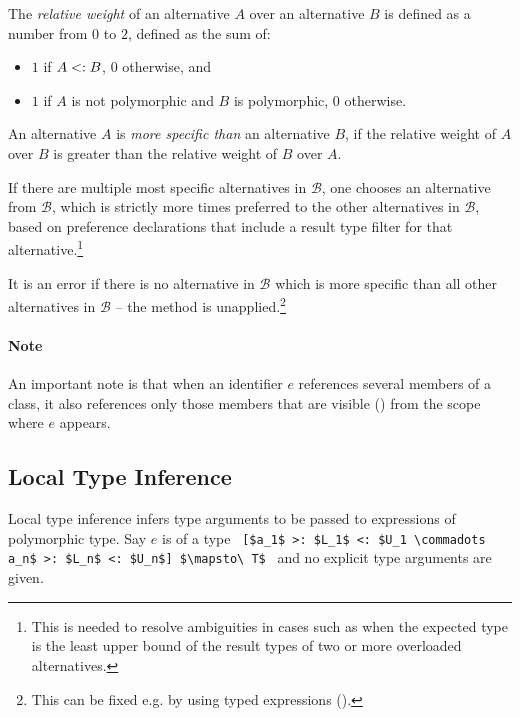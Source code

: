 \begin{definition}
The {\em relative weight} of an alternative $A$ over an alternative $B$ is defined as a number from $0$ to $2$, defined as the sum of:
\begin{itemize}
  \item $1$ if $A <: B$, $0$ otherwise, and
  \item $1$ if $A$ is not polymorphic and $B$ is polymorphic, $0$ otherwise.
\end{itemize}
\end{definition}

An alternative $A$ is {\em more specific than} an alternative $B$, if the relative weight of $A$ over $B$ is greater than the relative weight of $B$ over $A$. 

If there are multiple most specific alternatives in $\mathcal{B}$, one chooses an alternative from $\mathcal{B}$, which is strictly more times preferred to the other alternatives in $\mathcal{B}$, based on preference declarations that include a result type filter for that alternative.\footnote{This is needed to resolve ambiguities in cases such as when the expected type is the least upper bound of the result types of two or more overloaded alternatives.}

It is an error if there is no alternative in $\mathcal{B}$ which is more specific than all other alternatives in $\mathcal{B}$ -- the method is unapplied.\footnote{This can be fixed e.g. by using typed expressions ().}

\paragraph{Note}
An important note is that when an identifier $e$ references several members of a class, it also references only those members that are visible () from the scope where $e$ appears. 








\subsection{Local Type Inference}
\label{sec:local-type-inference}

Local type inference infers type arguments to be passed to expressions of polymorphic type. Say $e$ is of a type ~\lstinline![$a_1$ >: $L_1$ <: $U_1 \commadots a_n$ >: $L_n$ <: $U_n$] $\mapsto\ T$!~ and no explicit type arguments are given. 

